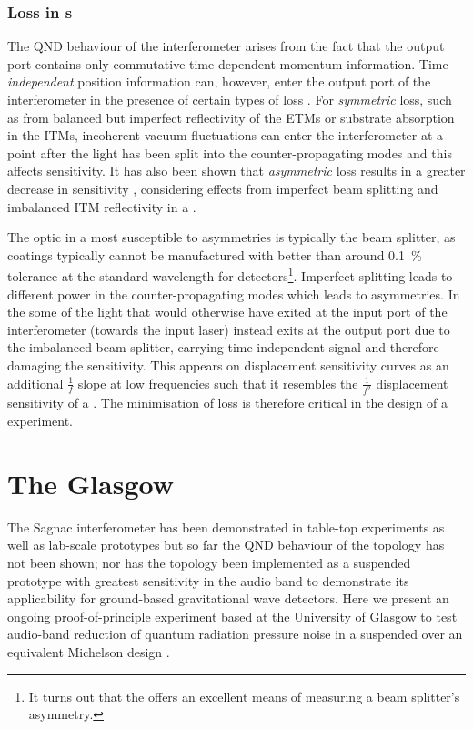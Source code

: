 \subsubsection{Loss in \SSM{}s}
The \gls{QND} behaviour of the interferometer arises from the fact that the output port contains only commutative time-dependent momentum information. Time-\emph{independent} position information can, however, enter the output port of the interferometer in the presence of certain types of loss \cite{Danilishin2004}. For \emph{symmetric} loss, such as from balanced but imperfect reflectivity of the \glspl{ETM} or substrate absorption in the \glspl{ITM}, incoherent vacuum fluctuations can enter the interferometer at a point after the light has been split into the counter-propagating modes and this affects sensitivity. It has also been shown that \emph{asymmetric} loss results in a greater decrease in sensitivity \cite{Danilishin2015}, considering effects from imperfect beam splitting and imbalanced \gls{ITM} reflectivity in a \SSM{}.

The optic in a \SSM{} most susceptible to asymmetries is typically the beam splitter, as coatings typically cannot be manufactured with better than around \SI{0.1}{\percent} tolerance at the standard wavelength for detectors\footnote{It turns out that the \SSM{} offers an excellent means of measuring a beam splitter's asymmetry.}. Imperfect splitting leads to different power in the counter-propagating modes which leads to asymmetries. In the \SSM{} some of the light that would otherwise have exited at the input port of the interferometer (towards the input laser) instead exits at the output port due to the imbalanced beam splitter, carrying time-independent signal and therefore damaging the sensitivity. This appears on displacement sensitivity curves as an additional $\frac{1}{f}$ slope at low frequencies such that it resembles the $\frac{1}{f^2}$ displacement sensitivity of a \MI{}. The minimisation of loss is therefore critical in the design of a \SSM{} experiment.

\section{The Glasgow \SSMEXPT{}}
The Sagnac interferometer has been demonstrated in table-top experiments \cite{Shaddock1998} as well as lab-scale prototypes \cite{Beyersdorf2002, Eberle2010} but so far the \gls{QND} behaviour of the \SSM{} topology has not been shown; nor has the topology been implemented as a suspended prototype with greatest sensitivity in the audio band to demonstrate its applicability for ground-based gravitational wave detectors. Here we present an ongoing proof-of-principle experiment based at the University of Glasgow to test audio-band reduction of quantum radiation pressure noise in a suspended \SSM{} over an equivalent Michelson design \cite{Graef2014}.

